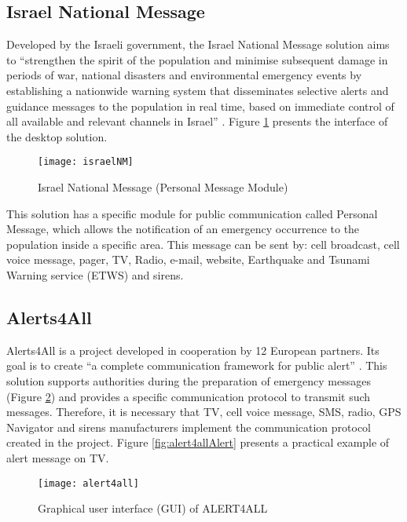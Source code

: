 \subsection*{Israel National Message}

Developed by the Israeli government, the Israel National Message solution aims to “strengthen the spirit of the population and minimise subsequent damage in periods of war, national disasters and environmental emergency events by establishing a nationwide warning system that disseminates selective alerts and guidance messages to the population in real time, based on immediate control of all available and relevant channels in Israel” \cite{nationalMessage}. Figure \ref{fig:israelNM} presents the interface of the desktop solution.

\begin{figure}[]
\begin{center}
  \texttt{[image: israelNM]}
\caption{Israel National Message (Personal Message Module)}
\label{fig:israelNM}
\end{center}
\end{figure}

This solution has a specific module for public communication called Personal Message, which allows the notification of an emergency occurrence to the population inside a specific area. This message can be sent by: cell broadcast, cell voice message, pager, TV, Radio, e-mail, website, Earthquake and Tsunami Warning service (ETWS) and sirens.

\subsection*{Alerts4All}
Alerts4All is a project developed in cooperation by 12 European partners. Its goal is to create “a complete communication framework for public alert” \cite{parraga2013complete}. This solution supports authorities during the preparation of emergency messages (Figure \ref{fig:allert4All}) and provides a specific communication protocol to transmit such messages. Therefore, it is necessary that TV, cell voice message, SMS, radio, GPS Navigator and sirens manufacturers implement the communication protocol created in the project. Figure \ref{fig:alert4allAlert} presents a practical example of alert message on TV.

\begin{figure}[]
\begin{center}
  \texttt{[image: alert4all]}
\caption{Graphical user interface (GUI) of ALERT4ALL}
\label{fig:allert4All}
\end{center}
\end{figure}

